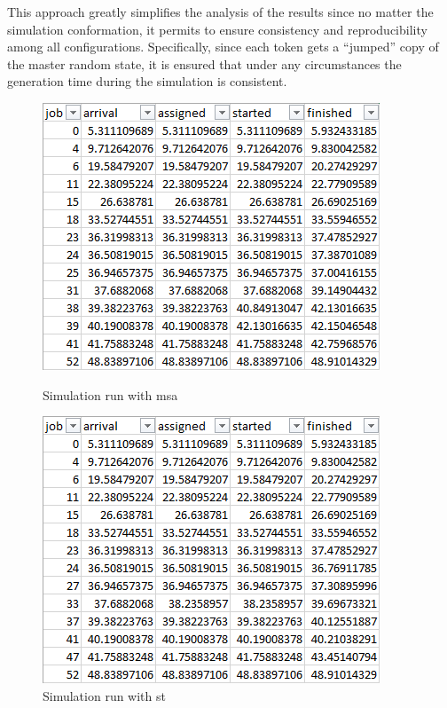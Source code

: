 This approach greatly simplifies the analysis of the results since no matter the simulation conformation, it permits to ensure consistency and reproducibility among all configurations. Specifically, since each token gets a ``jumped'' copy of the master random state, it is ensured that under any circumstances the generation time during the simulation is consistent.

\begin{figure}[!ht]
    \centering
    \begin{minipage}[b]{0.45\textwidth}
        \includegraphics[width=\textwidth]{img/pcg_msa}
        \caption{Simulation run with \gls{msa}}
        \label{fig:pcg_msa}
    \end{minipage}
    \hfill
    \begin{minipage}[b]{0.45\textwidth}
        \includegraphics[width=\textwidth]{img/pcg_st}
        \caption{Simulation run with \gls{st}}
        \label{fig:pcg_st}
    \end{minipage}
\end{figure}

